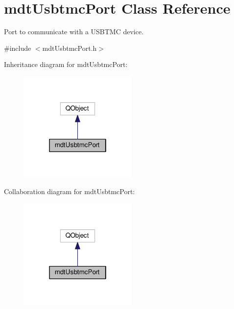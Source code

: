 \hypertarget{classmdt_usbtmc_port}{\section{mdt\-Usbtmc\-Port Class Reference}
\label{classmdt_usbtmc_port}
}


Port to communicate with a U\-S\-B\-T\-M\-C device.  




{\ttfamily \#include $<$mdt\-Usbtmc\-Port.\-h$>$}



Inheritance diagram for mdt\-Usbtmc\-Port\-:\nopagebreak
\begin{figure}[H]
\begin{center}
\leavevmode
\includegraphics[width=166pt]{classmdt_usbtmc_port__inherit__graph}
\end{center}
\end{figure}


Collaboration diagram for mdt\-Usbtmc\-Port\-:\nopagebreak
\begin{figure}[H]
\begin{center}
\leavevmode
\includegraphics[width=166pt]{classmdt_usbtmc_port__coll__graph}
\end{center}
\end{figure}
